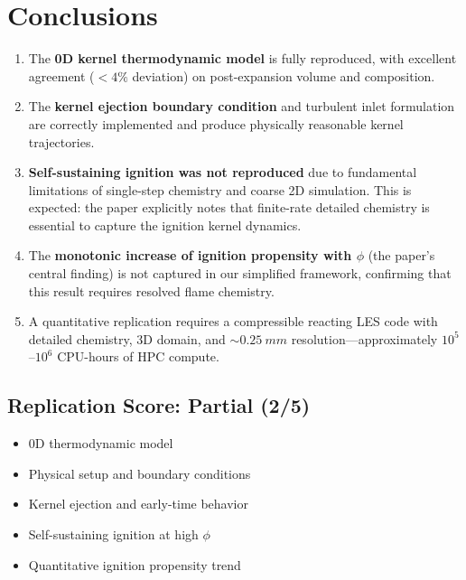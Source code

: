 \documentclass[11pt]{article}
\begin{document}
\section{Conclusions}

\begin{enumerate}
    \item The \textbf{0D kernel thermodynamic model} is fully reproduced, with excellent agreement ($<4\%$ deviation) on post-expansion volume and composition.
    \item The \textbf{kernel ejection boundary condition} and turbulent inlet formulation are correctly implemented and produce physically reasonable kernel trajectories.
    \item \textbf{Self-sustaining ignition was not reproduced} due to fundamental limitations of single-step chemistry and coarse 2D simulation. This is expected: the paper explicitly notes that finite-rate detailed chemistry is essential to capture the ignition kernel dynamics.
    \item The \textbf{monotonic increase of ignition propensity with $\phi$} (the paper's central finding) is not captured in our simplified framework, confirming that this result requires resolved flame chemistry.
    \item A quantitative replication requires a compressible reacting LES code with detailed chemistry, 3D domain, and $\sim\SI{0.25}{mm}$ resolution---approximately $10^5$--$10^6$ CPU-hours of HPC compute.
\end{enumerate}

\subsection{Replication Score: \textcolor{oursred}{Partial (2/5)}}
\begin{itemize}
    \item[\textcolor{darkgreen}{\checkmark}] 0D thermodynamic model
    \item[\textcolor{darkgreen}{\checkmark}] Physical setup and boundary conditions
    \item[\textcolor{darkgreen}{\checkmark}] Kernel ejection and early-time behavior
    \item[\textcolor{darkred}{$\times$}] Self-sustaining ignition at high $\phi$
    \item[\textcolor{darkred}{$\times$}] Quantitative ignition propensity trend
\end{itemize}
\end{document}
